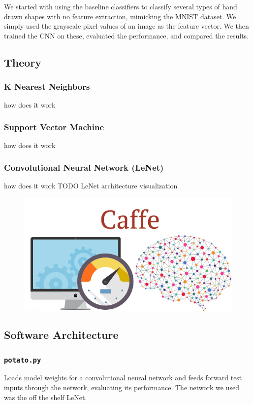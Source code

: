 \documentclass[leqno]{article}
\begin{document}
We started with using the baseline classifiers to classify several types of hand drawn shapes 
with no feature extraction, mimicking the MNIST dataset. We simply used the
grayscale pixel values of an image as the feature vector. We then trained the
CNN on these, evaluated the performance, and compared the results.

\subsection{Theory}
\subsubsection{K Nearest Neighbors}
how does it work
\subsubsection{Support Vector Machine}
how does it work
\subsubsection{Convolutional Neural Network (LeNet)}
how does it work
TODO LeNet architecture visualization
\begin{figure}[h!]
  \centering
  \includegraphics[width=\textwidth]{caffe.png}
\end{figure}

\subsection{Software Architecture}
\subsubsection{\texttt{potato.py}}
Loads model weights for a convolutional neural network and feeds
forward test inputs through the network, evaluating its performance. The network
we used was the off the shelf LeNet.
\end{document}
